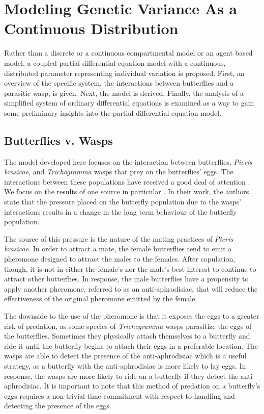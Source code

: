 \documentclass[review,authoryear]{elsarticle}
\begin{document}
\section{Modeling Genetic Variance As a Continuous Distribution}

Rather than a discrete or a continuous compartmental model or an agent based model, a
coupled partial differential equation model with a continuous, distributed parameter representing individual variation  is proposed. First, an overview of the specific system, the interactions
between butterflies and a parasitic wasp, is given. Next, the
model is derived. Finally, the analysis of a simplified system of
ordinary differential equations is examined as a way to gain some
preliminary insights into the partial differential equation model.

\subsection{Butterflies v. Wasps}
\label{butterflyVWasps}

The
model developed here focuses on the interaction between butterflies,
\textit{Pieris brasicae}, and \textit{Trichogramma} wasps that prey on
the butterflies' eggs. The interactions between these populations have
received a good deal of attention
\citep{PMC2797620,doi:10.1111/j.1439-0418.1986.tb00834.x,Figueroa2010AttractionOT,10.3389/fpls.2019.01768}. We
focus on the results of one source in particular  \cite{10.1093/beheco/arq007}. In their work, the authors state
that the pressure placed on the butterfly population due to the wasps'
interactions results in a change in the long term behaviour of the
butterfly population.

The source of this pressure is the nature of the mating practices of
\textit{Pieris brasicae}. In order to attract a mate, the female
butterflies tend to emit a pheromone designed to attract the males to
the females. After copulation, though, it is not in either the
female's nor the male's best interest to continue to attract other
butterflies. In response, the male butterflies have a propensity to
apply another pheromone, referred to as an anti-aphrodisiac, that will
reduce the effectiveness of the original pheromone emitted by the
female.

The downside to the use of the pheromone is that it exposes the eggs
to a greater risk of predation, as some species of \textit{Trichogramma}
wasps parasitize the eggs of the butterflies. Sometimes they
physically attach themselves to a butterfly and ride it until the
butterfly begins to attach their eggs in a preferable location. The
wasps are able to detect the presence of the anti-aphrodisiac which is
a useful strategy, as a butterfly with the
anti-aphrodisiac is more likely to lay eggs. In response, the wasps
are more likely to ride on a butterfly if they detect the
anti-aphrodisiac. It is important to note that this method of predation on
a butterfly's eggs requires a non-trivial time commitment with respect
to handling and detecting the presence of the eggs.
\end{document}
